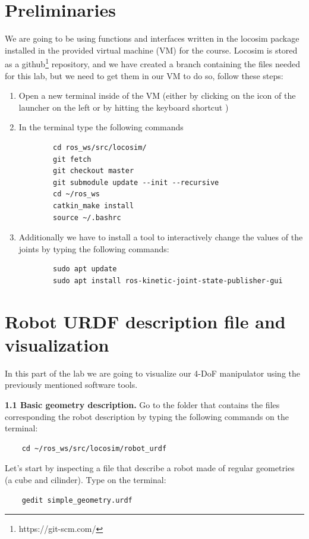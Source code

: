 \documentclass[11pt]{article}
\begin{document}
%
\section{Preliminaries}
We are going to be using functions and interfaces written in the locosim package installed in the provided virtual machine (VM) for the course. Locosim is stored as a github\footnote{https://git-scm.com/} repository, and we have created a branch containing the files needed for this lab, but we need to get them in our VM to do so, follow these steps:

\begin{enumerate}
	\item Open a new terminal inside of the VM (either by clicking on the icon of the launcher on the left or by hitting the keyboard shortcut )
	\item In the terminal type the following commands
	
	\begin{verbatim}
		cd ros_ws/src/locosim/
		git fetch 
		git checkout master
		git submodule update --init --recursive
		cd ~/ros_ws
		catkin_make install
		source ~/.bashrc
	\end{verbatim}

	\item Additionally we have to install a tool to interactively change the values of the joints by typing the following commands:
	\begin{verbatim}
		sudo apt update
		sudo apt install ros-kinetic-joint-state-publisher-gui
	\end{verbatim}
\end{enumerate}
%
\section{Robot URDF description file and visualization}
%
In this part of the lab we are going to visualize our 4-DoF manipulator using the previously mentioned software tools.

\textbf{1.1 Basic geometry description.} Go to the folder that contains the files corresponding the robot description by typing the following commands on the terminal:
\begin{verbatim}
	cd ~/ros_ws/src/locosim/robot_urdf
\end{verbatim}
Let's start by inspecting a file that describe a robot made of regular geometries (a cube and cilinder). Type on the terminal:
\begin{verbatim}
	gedit simple_geometry.urdf
\end{verbatim}
\end{document}
